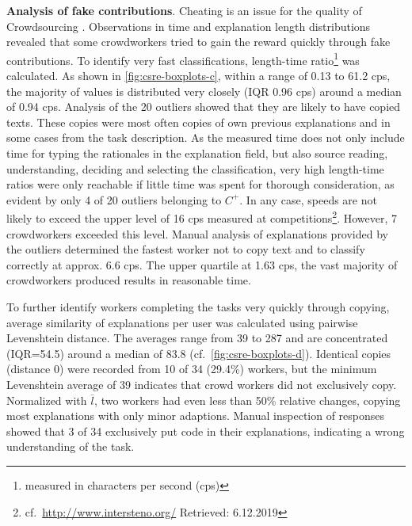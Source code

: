 \textbf{Analysis of fake contributions}. Cheating is an issue for the quality of \gls{Crowdsourcing} \autocite{Daniel2018CrowdsourcingQuality,Allahbakhsh2013}.
Observations in time and explanation length distributions revealed that some crowdworkers tried to gain the reward quickly through fake contributions.
To identify very fast classifications, length-time ratio\footnote{measured in characters per second (cps)} was calculated.
As shown in \cref{fig:csre-boxplots-c}, within a range of 0.13 to 61.2 cps, the majority of values is distributed very closely (IQR 0.96 cps) around a median of 0.94 cps.
Analysis of the 20 outliers showed that they are likely to have copied texts.
These copies were most often copies of own previous explanations and in some cases from the task description.
As the measured time does not only include time for typing the rationales in the explanation field, but also source reading, understanding, deciding and selecting the classification, very high length-time ratios were only reachable if little time was spent for thorough consideration, as evident by only 4 of 20 outliers belonging to \(C^+\).
In any case, speeds are not likely to exceed the upper level of 16 cps measured at competitions\footnote{cf.~\url{http://www.intersteno.org/} Retrieved: 6.12.2019}.
However, 7 crowdworkers exceeded this level.
Manual analysis of explanations provided by the outliers determined the fastest worker not to copy text and to classify correctly at approx.
6.6 cps.
The upper quartile at 1.63 cps, the vast majority of crowdworkers produced results in reasonable time.

To further identify workers completing the tasks very quickly through copying, average similarity of explanations per user was calculated using pairwise Levenshtein distance.
The averages range from 39 to 287 and are concentrated (IQR=54.5) around a median of 83.8
(cf.~\cref{fig:csre-boxplots-d}).
Identical copies (distance 0) were recorded from 10 of 34 (29.4\%) workers, but the minimum Levenshtein average of 39 indicates that crowd workers did not exclusively copy.
Normalized with \(\overline l\), two workers had even less than 50\% relative changes, copying most explanations with only minor adaptions.
Manual inspection of responses showed that 3 of 34 exclusively put code in their explanations, indicating a wrong understanding of the task.


